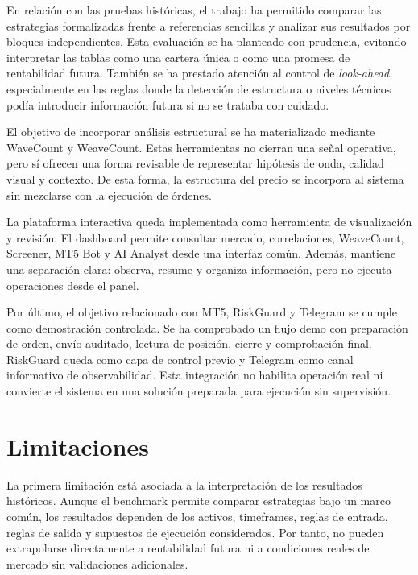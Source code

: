 En relaci\'on con las pruebas hist\'oricas, el trabajo ha permitido comparar las
estrategias formalizadas frente a referencias sencillas y analizar sus
resultados por bloques independientes. Esta evaluaci\'on se ha planteado con
prudencia, evitando interpretar las tablas como una cartera \'unica o como una
promesa de rentabilidad futura. Tambi\'en se ha prestado atenci\'on al control de
\textit{look-ahead}, especialmente en las reglas donde la detecci\'on de
estructura o niveles t\'ecnicos pod\'ia introducir informaci\'on futura si no se
trataba con cuidado.

El objetivo de incorporar an\'alisis estructural se ha materializado mediante
WaveCount y WeaveCount. Estas herramientas no cierran una se\~nal operativa,
pero s\'i ofrecen una forma revisable de representar hip\'otesis de onda, calidad
visual y contexto. De esta forma, la estructura del precio se incorpora al
sistema sin mezclarse con la ejecuci\'on de \'ordenes.

La plataforma interactiva queda implementada como herramienta de visualizaci\'on y revisi\'on. El
dashboard permite consultar mercado, correlaciones, WeaveCount, Screener, MT5
Bot y AI Analyst desde una interfaz com\'un. Adem\'as, mantiene una separaci\'on
clara: observa, resume y organiza informaci\'on, pero no ejecuta operaciones
desde el panel.

Por \'ultimo, el objetivo relacionado con MT5, RiskGuard y Telegram se cumple
como demostraci\'on controlada. Se ha comprobado un flujo demo con preparaci\'on de
orden, env\'io auditado, lectura de posici\'on, cierre y comprobaci\'on final.
RiskGuard queda como capa de control previo y Telegram como canal informativo de
observabilidad. Esta integraci\'on no habilita operaci\'on real ni convierte el
sistema en una soluci\'on preparada para ejecuci\'on sin supervisi\'on.

\section{Limitaciones}

La primera limitaci\'on est\'a asociada a la interpretaci\'on de los resultados
hist\'oricos. Aunque el benchmark permite comparar estrategias bajo un marco
com\'un, los resultados dependen de los activos, timeframes, reglas de
entrada, reglas de salida y supuestos de ejecuci\'on considerados. Por tanto, no
pueden extrapolarse directamente a rentabilidad futura ni a condiciones reales
de mercado sin validaciones adicionales.

